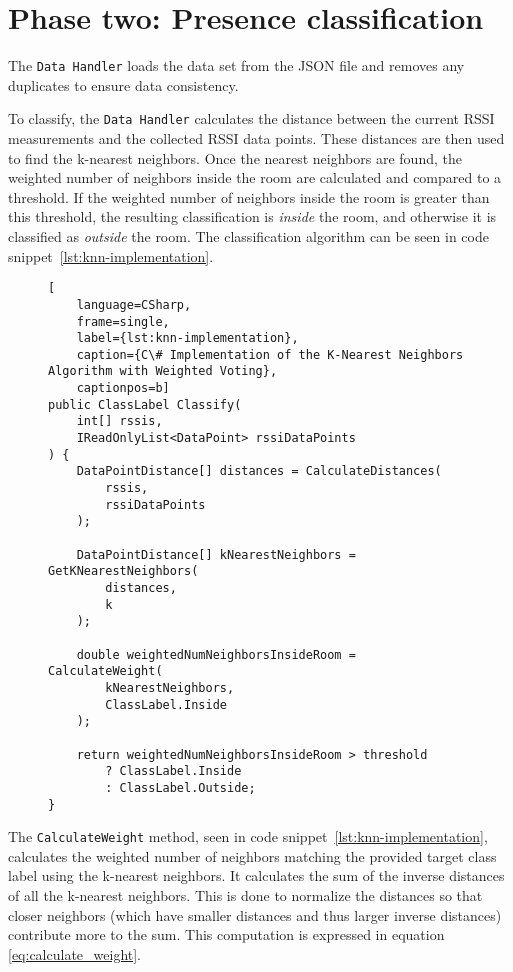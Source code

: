 \section{Phase two: Presence classification}\label{sec:knn_implementation}

The \texttt{Data Handler} loads the data set from the JSON file and removes any duplicates to ensure data consistency.

To classify, the \texttt{Data Handler} calculates the distance between the current RSSI measurements and the collected RSSI data points.
These distances are then used to find the k-nearest neighbors.
Once the nearest neighbors are found, the weighted number of neighbors inside the room are calculated and compared to a threshold.
If the weighted number of neighbors inside the room is greater than this threshold, the resulting classification is \textit{inside} the room, and otherwise it is classified as \textit{outside} the room.
The classification algorithm can be seen in code snippet~\ref{lst:knn-implementation}.

\begin{figure}[H]
\begin{lstlisting}[
	language=CSharp, 
	frame=single, 
	label={lst:knn-implementation},
	caption={C\# Implementation of the K-Nearest Neighbors Algorithm with Weighted Voting}, 
	captionpos=b] 
public ClassLabel Classify(
	int[] rssis, 
	IReadOnlyList<DataPoint> rssiDataPoints
) {
	DataPointDistance[] distances = CalculateDistances(
		rssis, 
		rssiDataPoints
	);

	DataPointDistance[] kNearestNeighbors = GetKNearestNeighbors(
		distances,
		k
	);

	double weightedNumNeighborsInsideRoom = CalculateWeight(
		kNearestNeighbors,
		ClassLabel.Inside
	);

	return weightedNumNeighborsInsideRoom > threshold 
		? ClassLabel.Inside 
		: ClassLabel.Outside;
}
\end{lstlisting}
\end{figure}

The \texttt{CalculateWeight} method, seen in code snippet~\ref{lst:knn-implementation}, calculates the weighted number of neighbors matching the provided target class label using the k-nearest neighbors.
It calculates the sum of the inverse distances of all the k-nearest neighbors. This is done to normalize the distances so that closer neighbors (which have smaller distances and thus larger inverse distances) contribute more to the sum.
This computation is expressed in equation \ref{eq:calculate_weight}.

